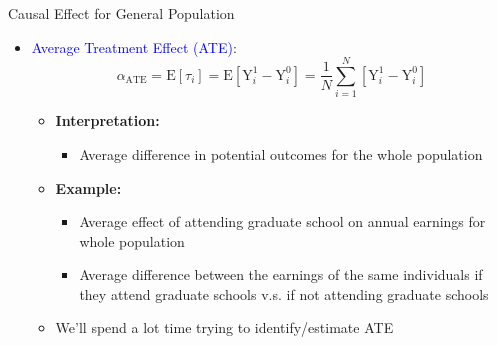 \documentclass[hyperref={pdfpagelabels=false}]{beamer}
\begin{document}
\begin{frame}{Causal Effect for General Population}
\begin{itemize} 

\item \textcolor{blue} {Average Treatment Effect (ATE)}:
\begin{equation*}
\alpha_{\text{ATE}} = \mathrm{E}[\tau_i] =  \mathrm{E}[\mathrm{Y}^{1}_{i}-\mathrm{Y}^{0}_{i}] = \dfrac{1}{N} \sum^N_{i=1} [\mathrm{Y}^{1}_{i}-\mathrm{Y}^{0}_{i}]
\end{equation*}

\begin{itemize} 
\vspace{0.2cm}
\item \textbf{Interpretation:} 
\vspace{0.3cm}
\begin{itemize} 
\item Average difference in potential outcomes for the whole population

\end{itemize}
\vspace{0.2cm}
\item \textbf{Example:}
\vspace{0.2cm}
\begin{itemize} 
	\item Average effect of attending graduate school on annual earnings for whole population
	\vspace{0.2cm}
\item Average difference between the earnings of the same individuals if they attend graduate schools v.s. if not attending graduate schools 
\end{itemize}
\vspace{0.2cm}	
\item We'll spend a lot time trying to identify/estimate ATE
\end{itemize}

\end{itemize}
\end{frame}
\end{document}
